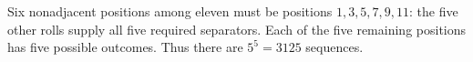 Six nonadjacent positions among eleven must be positions $1,3,5,7,9,11$: the five other rolls supply all five required separators. Each of the five remaining positions has five possible outcomes. Thus there are $5^5=\boxed{3125}$ sequences.
